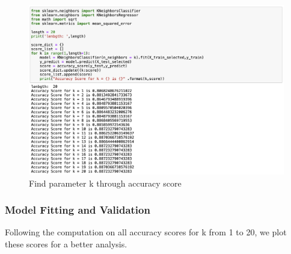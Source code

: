 \documentclass[12pt]{article} %
\theoremstyle{definition}
\begin{document}
\begin{figure}[h!]
    \centering
    \includegraphics[width=0.8\linewidth]{KNN/k.png}
    \caption{Find parameter k through accuracy score}
\end{figure}


\subsubsection{Model Fitting and Validation}
Following the computation on all accuracy scores for k from 1 to 20, we plot these scores for a better analysis.
\end{document}
